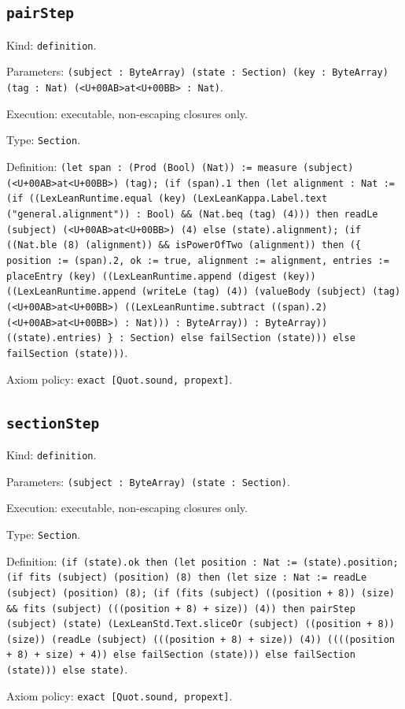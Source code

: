 \documentclass[11pt]{article}
\begin{document}
\subsection*{\texttt{pairStep}}
\noindent Kind: \texttt{definition}.\par
\noindent Parameters: \texttt{(subject : ByteArray) (state : Section) (key : ByteArray) (tag : Nat) (<U+00AB>at<U+00BB> : Nat)}.\par
\noindent Execution: executable, non-escaping closures only.\par
\noindent Type: \texttt{Section}.\par
\noindent Definition: \texttt{(let span : (Prod (Bool) (Nat)) := measure (subject) (<U+00AB>at<U+00BB>) (tag); (if (span).1 then (let alignment : Nat := (if ((LexLeanRuntime.equal (key) (LexLeanKappa.Label.text ("general.alignment")) : Bool) \&\& (Nat.beq (tag) (4))) then readLe (subject) (<U+00AB>at<U+00BB>) (4) else (state).alignment); (if ((Nat.ble (8) (alignment)) \&\& isPowerOfTwo (alignment)) then (\{ position := (span).2, ok := true, alignment := alignment, entries := placeEntry (key) ((LexLeanRuntime.append (digest (key)) ((LexLeanRuntime.append (writeLe (tag) (4)) (valueBody (subject) (tag) (<U+00AB>at<U+00BB>) ((LexLeanRuntime.subtract ((span).2) (<U+00AB>at<U+00BB>) : Nat))) : ByteArray)) : ByteArray)) ((state).entries) \} : Section) else failSection (state))) else failSection (state)))}.\par
\noindent Axiom policy: \texttt{exact [Quot.sound, propext]}.\par
\subsection*{\texttt{sectionStep}}
\noindent Kind: \texttt{definition}.\par
\noindent Parameters: \texttt{(subject : ByteArray) (state : Section)}.\par
\noindent Execution: executable, non-escaping closures only.\par
\noindent Type: \texttt{Section}.\par
\noindent Definition: \texttt{(if (state).ok then (let position : Nat := (state).position; (if fits (subject) (position) (8) then (let size : Nat := readLe (subject) (position) (8); (if (fits (subject) ((position + 8)) (size) \&\& fits (subject) (((position + 8) + size)) (4)) then pairStep (subject) (state) (LexLeanStd.Text.sliceOr (subject) ((position + 8)) (size)) (readLe (subject) (((position + 8) + size)) (4)) ((((position + 8) + size) + 4)) else failSection (state))) else failSection (state))) else state)}.\par
\noindent Axiom policy: \texttt{exact [Quot.sound, propext]}.\par
\end{document}
